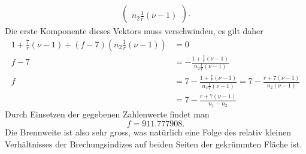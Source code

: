 \begin{loesung}
\begin{align*}
\begin{pmatrix}
\\
n_2\frac1r(\nu-1)
\end{pmatrix}.
\end{align*}
Die erste Komponente dieses Vektors muss verschwinden, es gilt daher
\begin{align*}
1+\frac7r(\nu-1)
+
(f-7)(n_2\frac1r(\nu-1))
&=
0
\\
f-7
&=
-\frac{1+\frac7r(\nu-1)}{ n_2\frac1r(\nu-1) }
\\
f
&=
7
-\frac{1+\frac7r(\nu-1)}{ n_2\frac1r(\nu-1) }
=
7
-\frac{r+7(\nu-1)}{ n_2(\nu-1) }
\\
&=
7
-\frac{r+7(\nu-1)}{ n_1 -n_2 }
\end{align*}
Durch Einsetzen der gegebenen Zahlenwerte findet man
\[
f=911.777908.
\]
Die Brennweite ist also sehr gross, was natürlich eine Folge des
relativ kleinen Verhältnisses der Brechungsindizes auf beiden
Seiten der gekrümmten Fläche ist.
\end{loesung}


